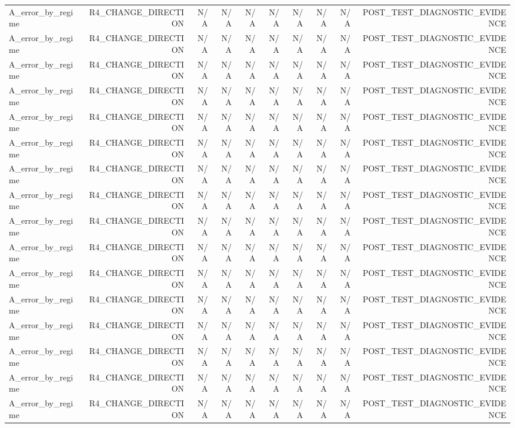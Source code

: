 \begin{table}[h!]
\begin{tabular}{lrrrrrrrrr}
A\_error\_by\_regime & R4\_CHANGE\_DIRECTION & N/A & N/A & N/A & N/A & N/A & N/A & N/A & POST\_TEST\_DIAGNOSTIC\_EVIDENCE \\
A\_error\_by\_regime & R4\_CHANGE\_DIRECTION & N/A & N/A & N/A & N/A & N/A & N/A & N/A & POST\_TEST\_DIAGNOSTIC\_EVIDENCE \\
A\_error\_by\_regime & R4\_CHANGE\_DIRECTION & N/A & N/A & N/A & N/A & N/A & N/A & N/A & POST\_TEST\_DIAGNOSTIC\_EVIDENCE \\
A\_error\_by\_regime & R4\_CHANGE\_DIRECTION & N/A & N/A & N/A & N/A & N/A & N/A & N/A & POST\_TEST\_DIAGNOSTIC\_EVIDENCE \\
A\_error\_by\_regime & R4\_CHANGE\_DIRECTION & N/A & N/A & N/A & N/A & N/A & N/A & N/A & POST\_TEST\_DIAGNOSTIC\_EVIDENCE \\
A\_error\_by\_regime & R4\_CHANGE\_DIRECTION & N/A & N/A & N/A & N/A & N/A & N/A & N/A & POST\_TEST\_DIAGNOSTIC\_EVIDENCE \\
A\_error\_by\_regime & R4\_CHANGE\_DIRECTION & N/A & N/A & N/A & N/A & N/A & N/A & N/A & POST\_TEST\_DIAGNOSTIC\_EVIDENCE \\
A\_error\_by\_regime & R4\_CHANGE\_DIRECTION & N/A & N/A & N/A & N/A & N/A & N/A & N/A & POST\_TEST\_DIAGNOSTIC\_EVIDENCE \\
A\_error\_by\_regime & R4\_CHANGE\_DIRECTION & N/A & N/A & N/A & N/A & N/A & N/A & N/A & POST\_TEST\_DIAGNOSTIC\_EVIDENCE \\
A\_error\_by\_regime & R4\_CHANGE\_DIRECTION & N/A & N/A & N/A & N/A & N/A & N/A & N/A & POST\_TEST\_DIAGNOSTIC\_EVIDENCE \\
A\_error\_by\_regime & R4\_CHANGE\_DIRECTION & N/A & N/A & N/A & N/A & N/A & N/A & N/A & POST\_TEST\_DIAGNOSTIC\_EVIDENCE \\
A\_error\_by\_regime & R4\_CHANGE\_DIRECTION & N/A & N/A & N/A & N/A & N/A & N/A & N/A & POST\_TEST\_DIAGNOSTIC\_EVIDENCE \\
A\_error\_by\_regime & R4\_CHANGE\_DIRECTION & N/A & N/A & N/A & N/A & N/A & N/A & N/A & POST\_TEST\_DIAGNOSTIC\_EVIDENCE \\
A\_error\_by\_regime & R4\_CHANGE\_DIRECTION & N/A & N/A & N/A & N/A & N/A & N/A & N/A & POST\_TEST\_DIAGNOSTIC\_EVIDENCE \\
A\_error\_by\_regime & R4\_CHANGE\_DIRECTION & N/A & N/A & N/A & N/A & N/A & N/A & N/A & POST\_TEST\_DIAGNOSTIC\_EVIDENCE \\
A\_error\_by\_regime & R4\_CHANGE\_DIRECTION & N/A & N/A & N/A & N/A & N/A & N/A & N/A & POST\_TEST\_DIAGNOSTIC\_EVIDENCE \\

\end{tabular}
\end{table}
